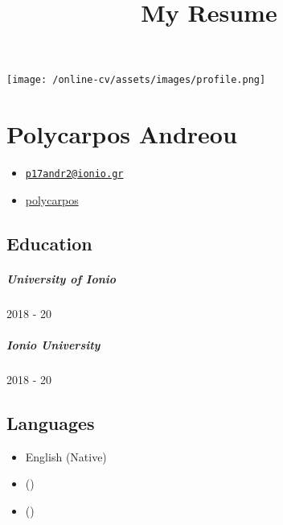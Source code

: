 \documentclass[english,]{article}
\title{My Resume}
\date{}
\providecommand{\tightlist}{%
  \setlength{\itemsep}{0pt}\setlength{\parskip}{0pt}}
\let\oldparagraph\paragraph
\renewcommand{\paragraph}[1]{\oldparagraph{#1}\mbox{}}
\let\oldsubparagraph\subparagraph
\renewcommand{\subparagraph}[1]{\oldsubparagraph{#1}\mbox{}}
\begin{document}
\maketitle

\texttt{[image: /online-cv/assets/images/profile.png]}

\hypertarget{polycarpos-andreou}{%
\section{Polycarpos Andreou}\label{polycarpos-andreou}}

\begin{itemize}
\tightlist
\item
  \emph{} \href{mailto:p17andr2@ionio.gr}{\nolinkurl{p17andr2@ionio.gr}}
\item
  \emph{} \href{http://github.com/polycarpos}{polycarpos}
\end{itemize}

\hypertarget{education}{%
\subsection{Education}\label{education}}

\hypertarget{section}{%
\paragraph{}\label{section}}

\hypertarget{university-of-ionio}{%
\subparagraph{University of Ionio}\label{university-of-ionio}}

2018 - 20

\hypertarget{section-1}{%
\paragraph{}\label{section-1}}

\hypertarget{ionio-university}{%
\subparagraph{Ionio University}\label{ionio-university}}

2018 - 20

\hypertarget{languages}{%
\subsection{Languages}\label{languages}}

\begin{itemize}
\tightlist
\item
  English {(Native)}
\item
  {()}
\item
  {()}
\end{itemize}
\end{document}
